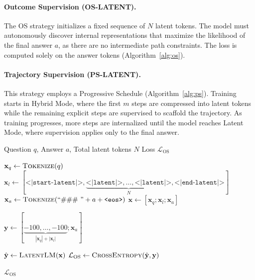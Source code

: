 \paragraph{Outcome Supervision (OS-LATENT).} 
The OS strategy initializes a fixed sequence of $N$ latent tokens. The model must autonomously discover internal representations that maximize the likelihood of the final answer $a$, as there are no intermediate path constraints. The loss is computed solely on the answer tokens (Algorithm~\ref{alg:os}).


\paragraph{Trajectory Supervision (PS-LATENT).} 
This strategy employs a Progressive Schedule (Algorithm~\ref{alg:ps}). Training starts in Hybrid Mode, where the first $m$ steps are compressed into latent tokens while the remaining explicit steps are supervised to scaffold the trajectory. As training progresses, more steps are internalized until the model reaches Latent Mode, where supervision applies only to the final answer.


\begin{algorithm}[h]
\footnotesize
\caption{Outcome Supervision (OS-LATENT)}
\label{alg:os}
\begin{algorithmic}[1]
 Question $q$, Answer $a$, Total latent tokens $N$
 Loss $\mathcal{L}_{\text{OS}}$

\STATE $\mathbf{x}_q \gets \textsc{Tokenize}(q)$
\STATE $\mathbf{x}_l \gets [\texttt{<|start-latent|>}, \underbrace{\texttt{<|latent|>}, \ldots, \texttt{<|latent|>}}_{N}, \texttt{<|end-latent|>}]$
\STATE $\mathbf{x}_a \gets \textsc{Tokenize}(\text{``\#\#\# ''} + a + \texttt{<eos>})$
\STATE $\mathbf{x} \gets [\mathbf{x}_q; \mathbf{x}_l; \mathbf{x}_a]$ 

\STATE
\STATE $\mathbf{y} \gets [\underbrace{-100, \ldots, -100}_{|\mathbf{x}_q| + |\mathbf{x}_l|}; \mathbf{x}_a]$ 

\STATE $\hat{\mathbf{y}} \gets \textsc{LatentLM}(\mathbf{x})$
\STATE $\mathcal{L}_{\text{OS}} \gets \textsc{CrossEntropy}(\hat{\mathbf{y}}, \mathbf{y})$

 $\mathcal{L}_{\text{OS}}$
\end{algorithmic}
\end{algorithm}


